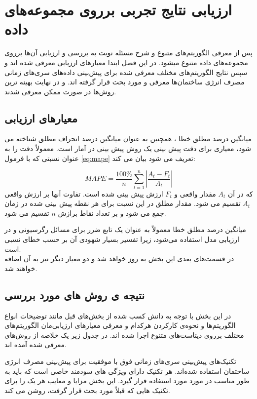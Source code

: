 \chapter{ارزیابی نتایج تجربی برروی مجموعه‌های داده}

پس از معرفی الگوریتم‌های متنوع و شرح مسئله نوبت به بررسی و ارزیابی آن‌ها برروی مجموعه‌های داده‌ متنوع میشود. در این فصل ابتدا معیار‌های ارزیابی معرفی شده اند و سپس 
نتایج الگوریتم‌های مختلف معرفی شده برای پیش‌بینی داده‌های سری‌های زمانی مصرف انرژی ساختمان‌ها معرفی و مورد بحث قرار گرفته اند.
و در نهایت بهینه ترین روش‌ها در صورت ممکن معرفی شدند.
\section{معیار‌های ارزیابی}

میانگین درصد مطلق خطا ، همچنین به عنوان میانگین درصد انحراف مطلق 
 شناخته می شود، معیاری برای دقت پیش بینی یک روش پیش بینی در آمار است. معمولاً دقت را به عنوان نسبتی که با فرمول \ref{eq:mape} تعریف می شود بیان می کند:

 \begin{equation}\label{eq:mape}
    MAPE = \frac{100\%}{n}\sum_{t=1}^{n}\left |\frac{A_t - F_t}{A_t}\right|
\end{equation}
\noindent
که در آن $A_t$ مقدار واقعی و $F_t$ ارزش پیش بینی شده است. تفاوت آنها بر ارزش واقعی $A_t$ تقسیم می شود. مقدار مطلق در این نسبت برای هر نقطه پیش بینی شده
 در زمان جمع می شود
 و بر تعداد نقاط برازش $n$ تقسیم می شود.

 
 \noindent
 میانگین درصد مطلق خطا معمولاً به عنوان یک تابع ضرر برای مسائل رگرسیونی و در ارزیابی مدل استفاده می‌شود،
 زیرا تفسیر بسیار شهودی آن بر حسب خطای نسبی است.
 \\
 در قسمت‌های بعدی این بخش به روز خواهد شد و دو معیار دیگر نیز به آن اضافه خواهند شد.

\section{نتیجه ی روش های مورد بررسی}
در این بخش با توجه به دانش کسب شده از بخش‌های قبل 
مانند توضیحات انواع الگوریتم‌ها و نحوه‌ی کارکردن هرکدام و معرفی معیار‌های ارزیابی‌مان الگوریتم‌های مختلف  برروی دیتاست‌های متنوع اجرا شده اند.
در جدول زیر یک خلاصه از روش‌های معرفی شده آمده اند.

تکنیک‌های پیش‌بینی سری‌های زمانی فوق با موفقیت برای پیش‌بینی مصرف انرژی ساختمان استفاده شده‌اند. هر تکنیک دارای ویژگی های سودمند خاصی است که باید به طور مناسب در مورد مورد استفاده قرار گیرد. 
این بخش مزایا و معایب هر یک را برای تکنیک هایی که قبلاً مورد بحث قرار گرفت، روشن می کند.


